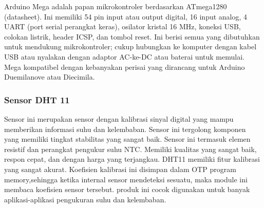 Arduino Mega adalah papan mikrokontroler berdasarkan ATmega1280 (datasheet). Ini memiliki 54 pin input atau output digital, 16 input analog, 4 UART (port serial perangkat keras), osilator kristal 16 MHz, koneksi USB, colokan listrik, header ICSP, dan tombol reset. Ini berisi semua yang dibutuhkan untuk mendukung mikrokontroler; cukup hubungkan ke komputer dengan kabel USB atau nyalakan dengan adaptor AC-ke-DC atau baterai untuk memulai. Mega kompatibel dengan kebanyakan perisai yang dirancang untuk Arduino Duemilanove atau Diecimila.

\subsubsection{Sensor DHT 11}
Sensor ini merupakan sensor dengan kalibrasi sinyal digital yang mampu memberikan informasi suhu dan kelembaban. Sensor ini tergolong komponen yang memiliki tingkat stabilitas yang sangat baik. Sensor ini termasuk elemen resistif dan perangkat pengukur suhu NTC.
Memiliki kualitas yang sangat baik, respon cepat, dan dengan harga yang
terjangkau. DHT11 memiliki fitur kalibrasi yang sangat akurat. Koefisien kalibrasi ini disimpan dalam OTP program memory,sehingga ketika internal sensor mendeteksi sesuatu, maka module ini membaca koefisien sensor tersebut. produk ini cocok digunakan untuk banyak aplikasi-aplikasi pengukuran suhu dan kelembaban.